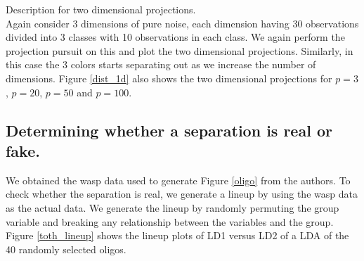 \documentclass[12]{article}
\begin{document}
{\color{red} Description for two dimensional projections.} \\
Again consider 3 dimensions of pure noise, each dimension having 30 observations divided into 3 classes with 10 observations in each class. We again perform the projection pursuit on this and plot the two dimensional projections. Similarly, in this case the 3 colors starts separating out as we increase the number of dimensions.  Figure \ref{dist_1d} also shows the two dimensional projections for $p=3$, $p=20$, $p=50$ and $p=100$.






\subsection{Determining whether a separation is real or fake. }

We obtained the wasp data used to generate Figure \ref{oligo} from the authors. To check whether the separation is real, we generate a lineup by using the wasp data as the actual data. We generate the lineup by randomly permuting the group variable and breaking any relationship between the variables  and the group. Figure \ref{toth_lineup} shows the lineup plots of LD1 versus LD2 of a LDA of the 40 randomly selected oligos.
\end{document}
